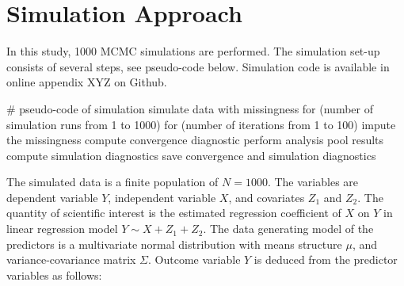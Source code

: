 \documentclass[article]{jss}
\begin{document}
% 
% 
% 
% 



\section{Simulation Approach}

In this study, 1000 MCMC simulations are performed. The simulation set-up consists of several steps, see pseudo-code below. Simulation code is available in online appendix XYZ on Github.

\begin{Code}
# pseudo-code of simulation 
simulate data with missingness
for (number of simulation runs from 1 to 1000)
  for (number of iterations from 1 to 100)
    impute the missingness
    compute convergence diagnostic
    perform analysis
    pool results
    compute simulation diagnostics
save convergence and simulation diagnostics
\end{Code}

The simulated data is a finite population of $N=1000$. The variables are dependent variable $Y$, independent variable $X$, and covariates $Z_1$ and $Z_2$. The quantity of scientific interest is the estimated regression coefficient of $X$ on $Y$ in linear regression model $Y \sim X+Z_1+Z_2$. The data generating model of the predictors is a multivariate normal distribution with means structure $\mu$, and variance-covariance matrix $\Sigma$. Outcome variable $Y$ is deduced from the predictor variables as follows:
\end{document}
